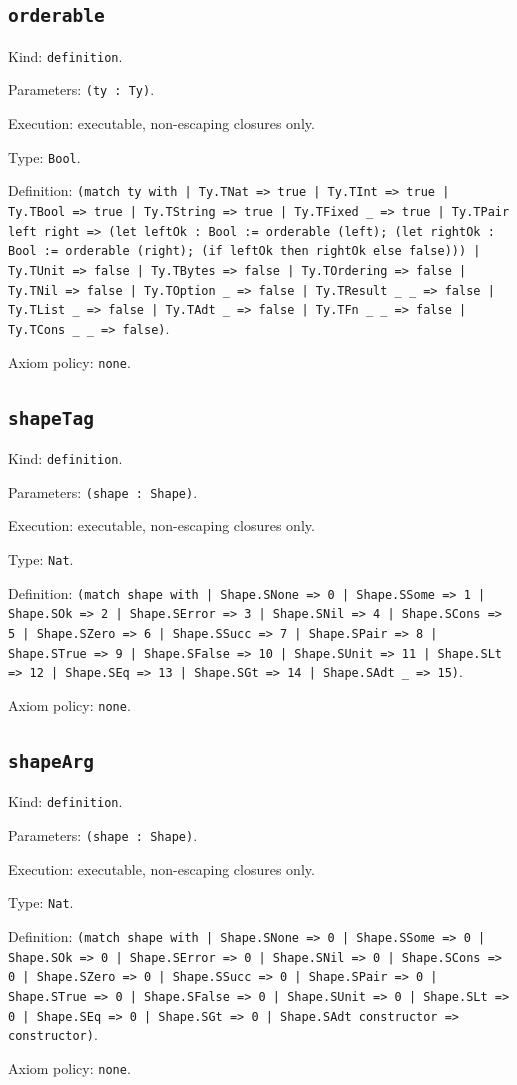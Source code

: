 \documentclass[11pt]{article}
\begin{document}
\subsection*{\texttt{orderable}}
\noindent Kind: \texttt{definition}.\par
\noindent Parameters: \texttt{(ty : Ty)}.\par
\noindent Execution: executable, non-escaping closures only.\par
\noindent Type: \texttt{Bool}.\par
\noindent Definition: \texttt{(match ty with | Ty.TNat => true | Ty.TInt => true | Ty.TBool => true | Ty.TString => true | Ty.TFixed \_ => true | Ty.TPair left right => (let leftOk : Bool := orderable (left); (let rightOk : Bool := orderable (right); (if leftOk then rightOk else false))) | Ty.TUnit => false | Ty.TBytes => false | Ty.TOrdering => false | Ty.TNil => false | Ty.TOption \_ => false | Ty.TResult \_ \_ => false | Ty.TList \_ => false | Ty.TAdt \_ => false | Ty.TFn \_ \_ => false | Ty.TCons \_ \_ => false)}.\par
\noindent Axiom policy: \texttt{none}.\par
\subsection*{\texttt{shapeTag}}
\noindent Kind: \texttt{definition}.\par
\noindent Parameters: \texttt{(shape : Shape)}.\par
\noindent Execution: executable, non-escaping closures only.\par
\noindent Type: \texttt{Nat}.\par
\noindent Definition: \texttt{(match shape with | Shape.SNone => 0 | Shape.SSome => 1 | Shape.SOk => 2 | Shape.SError => 3 | Shape.SNil => 4 | Shape.SCons => 5 | Shape.SZero => 6 | Shape.SSucc => 7 | Shape.SPair => 8 | Shape.STrue => 9 | Shape.SFalse => 10 | Shape.SUnit => 11 | Shape.SLt => 12 | Shape.SEq => 13 | Shape.SGt => 14 | Shape.SAdt \_ => 15)}.\par
\noindent Axiom policy: \texttt{none}.\par
\subsection*{\texttt{shapeArg}}
\noindent Kind: \texttt{definition}.\par
\noindent Parameters: \texttt{(shape : Shape)}.\par
\noindent Execution: executable, non-escaping closures only.\par
\noindent Type: \texttt{Nat}.\par
\noindent Definition: \texttt{(match shape with | Shape.SNone => 0 | Shape.SSome => 0 | Shape.SOk => 0 | Shape.SError => 0 | Shape.SNil => 0 | Shape.SCons => 0 | Shape.SZero => 0 | Shape.SSucc => 0 | Shape.SPair => 0 | Shape.STrue => 0 | Shape.SFalse => 0 | Shape.SUnit => 0 | Shape.SLt => 0 | Shape.SEq => 0 | Shape.SGt => 0 | Shape.SAdt constructor => constructor)}.\par
\noindent Axiom policy: \texttt{none}.\par
\end{document}
